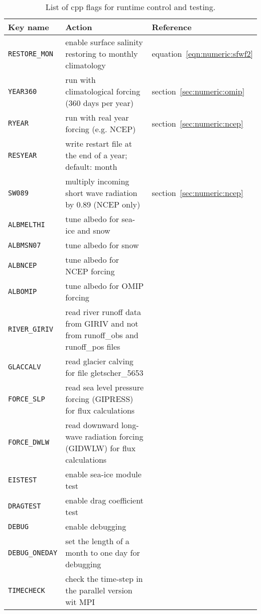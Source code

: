 \begin{table}[ht]
\begin{footnotesize}
        \begin{tabular}[t]{l|p{8cm}|l}
          Key name &
          Action &
	  Reference \\
        \hline	
         \texttt{RESTORE\_MON} &
           enable surface salinity restoring to monthly climatology &
           equation~\ref{eqn:numeric:sfwf2}\\	
         \texttt{YEAR360} &
           run with climatological forcing (360 days per year) &   	  		
           section~\ref{sec:numeric:omip}\\	
         \texttt{RYEAR} &
           run with real year forcing (e.g. NCEP) &   	 	  		
           section~\ref{sec:numeric:ncep}\\		
         \texttt{RESYEAR} &
           write restart file at the end of a year; default: month    &
        \\
         \texttt{SW089} &
            multiply incoming short wave radiation by 0.89 (NCEP only) &
            section~\ref{sec:numeric:ncep} \\
         \texttt{ALBMELTHI} &
            tune albedo for sea-ice and snow &
        \\
         \texttt{ALBMSN07} &
            tune albedo for snow  &
        \\
         \texttt{ALBNCEP} &
            tune albedo for NCEP forcing  &
        \\
         \texttt{ALBOMIP} &
            tune albedo for OMIP forcing  &
        \\
         \texttt{RIVER\_GIRIV} &
            read river runoff data from GIRIV and not from runoff\_obs and runoff\_pos files  &
        \\
         \texttt{GLACCALV} &
            read glacier calving for file gletscher\_5653  &
        \\
         \texttt{FORCE\_SLP} &
            read sea level pressure forcing (GIPRESS) for flux calculations   &
        \\
         \texttt{FORCE\_DWLW} &
            read downward long-wave radiation forcing (GIDWLW) for flux calculations   &
        \\
         \texttt{EISTEST} &
            enable sea-ice module test  &
        \\
         \texttt{DRAGTEST} &
            enable drag coefficient test   &
        \\
         \texttt{DEBUG} &
            enable debugging   &
        \\
         \texttt{DEBUG\_ONEDAY} &
            set the length of a month to one day for debugging  &
        \\
         \texttt{TIMECHECK} &
            check the time-step in the parallel version wit MPI   &
        \\
        \end{tabular}
\end{footnotesize}
\caption[List of cpp flags for runtime control and testing]{List of cpp flags for runtime control and testing.}
\label{tb:using:cpp-flags-run}
\end{table}



